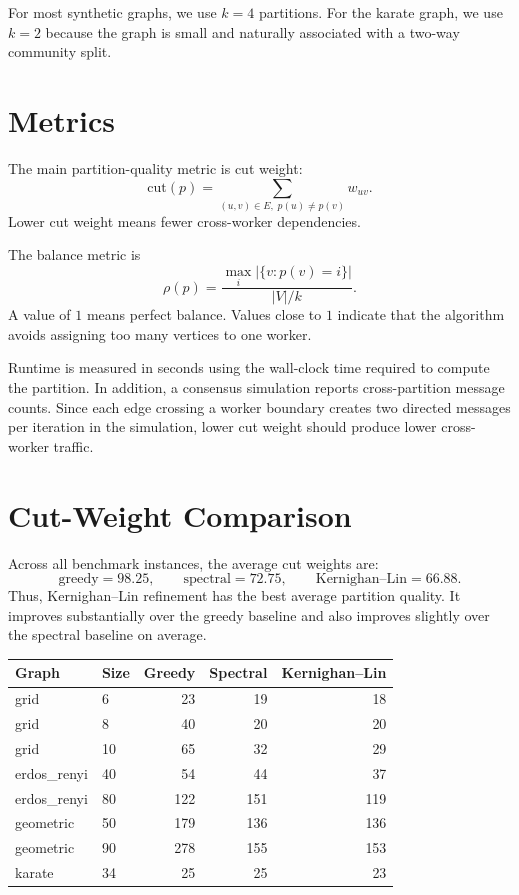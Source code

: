 \documentclass[11pt]{article}
\begin{document}
For most synthetic graphs, we use $k=4$ partitions. For the karate graph, we
use $k=2$ because the graph is small and naturally associated with a two-way
community split.

\section{Metrics}

The main partition-quality metric is cut weight:
\[
    \mathrm{cut}(p)
    =
    \sum_{(u,v)\in E,\;p(u)\neq p(v)} w_{uv}.
\]
Lower cut weight means fewer cross-worker dependencies.

The balance metric is
\[
    \rho(p)=
    \frac{\max_i |\{v:p(v)=i\}|}{|V|/k}.
\]
A value of $1$ means perfect balance. Values close to $1$ indicate that the
algorithm avoids assigning too many vertices to one worker.

Runtime is measured in seconds using the wall-clock time required to compute
the partition. In addition, a consensus simulation reports cross-partition
message counts. Since each edge crossing a worker boundary creates two
directed messages per iteration in the simulation, lower cut weight should
produce lower cross-worker traffic.

\section{Cut-Weight Comparison}

Across all benchmark instances, the average cut weights are:
\[
    \text{greedy}=98.25,\qquad
    \text{spectral}=72.75,\qquad
    \text{Kernighan--Lin}=66.88.
\]
Thus, Kernighan--Lin refinement has the best average partition quality. It
improves substantially over the greedy baseline and also improves slightly
over the spectral baseline on average.

\begin{center}
\begin{tabular}{llrrr}
\toprule
Graph & Size & Greedy & Spectral & Kernighan--Lin \\
\midrule
grid & 6 & 23 & 19 & 18 \\
grid & 8 & 40 & 20 & 20 \\
grid & 10 & 65 & 32 & 29 \\
erdos\_renyi & 40 & 54 & 44 & 37 \\
erdos\_renyi & 80 & 122 & 151 & 119 \\
geometric & 50 & 179 & 136 & 136 \\
geometric & 90 & 278 & 155 & 153 \\
karate & 34 & 25 & 25 & 23 \\
\bottomrule
\end{tabular}
\end{center}
\end{document}
